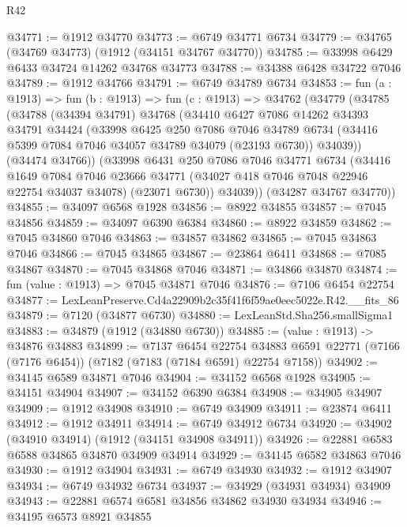 \begin{lexlean}{R42}
\begin{coremodule}
{@34771 := @1912 @34770
@34773 := @6749 @34771 @6734
@34779 := @34765 (@34769 @34773) (@1912 (@34151 @34767 @34770))
@34785 := @33998 @6429 @6433 @34724 @14262 @34768 @34773
@34788 := @34388 @6428 @34722 @7046
@34789 := @1912 @34766
@34791 := @6749 @34789 @6734
@34853 := fun (a : @1913) =>
  fun (b : @1913) =>
  fun (c : @1913) =>
  @34762
    (@34779
      (@34785
        (@34788
          (@34394 @34791)
          @34768
          (@34410
            @6427
            @7086
            @14262
            @34393
            @34791
            @34424
            (@33998
              @6425
              @250
              @7086
              @7046
              @34789
              @6734
              (@34416 @5399 @7084 @7046 @34057 @34789 @34079 (@23193 @6730))
              @34039))
          (@34474 @34766))
        (@33998
          @6431
          @250
          @7086
          @7046
          @34771
          @6734
          (@34416
            @1649
            @7084
            @7046
            @23666
            @34771
            (@34027 @418 @7046 @7048 @22946 @22754 @34037 @34078)
            (@23071 @6730))
          @34039))
      (@34287 @34767 @34770))
@34855 := @34097 @6568 @1928
@34856 := @8922 @34855
@34857 := @7045 @34856
@34859 := @34097 @6390 @6384
@34860 := @8922 @34859
@34862 := @7045 @34860 @7046
@34863 := @34857 @34862
@34865 := @7045 @34863 @7046
@34866 := @7045 @34865
@34867 := @23864 @6411
@34868 := @7085 @34867
@34870 := @7045 @34868 @7046
@34871 := @34866 @34870
@34874 := fun (value : @1913) => @7045 @34871 @7046
@34876 := @7106 @6454 @22754
@34877 := LexLeanPreserve.Cd4a22909b2c35f41f6f59ae0eec5022e.R42.__fits_86
@34879 := @7120 (@34877 @6730)
@34880 := LexLeanStd.Sha256.smallSigma1
@34883 := @34879 (@1912 (@34880 @6730))
@34885 := (value : @1913) -> @34876 @34883
@34899 := @7137
    @6454
    @22754
    @34883
    @6591
    @22771
    (@7166 (@7176 @6454))
    (@7182 (@7183 (@7184 @6591) @22754 @7158))
@34902 := @34145 @6589 @34871 @7046
@34904 := @34152 @6568 @1928
@34905 := @34151 @34904
@34907 := @34152 @6390 @6384
@34908 := @34905 @34907
@34909 := @1912 @34908
@34910 := @6749 @34909
@34911 := @23874 @6411
@34912 := @1912 @34911
@34914 := @6749 @34912 @6734
@34920 := @34902 (@34910 @34914) (@1912 (@34151 @34908 @34911))
@34926 := @22881 @6583 @6588 @34865 @34870 @34909 @34914
@34929 := @34145 @6582 @34863 @7046
@34930 := @1912 @34904
@34931 := @6749 @34930
@34932 := @1912 @34907
@34934 := @6749 @34932 @6734
@34937 := @34929 (@34931 @34934) @34909
@34943 := @22881 @6574 @6581 @34856 @34862 @34930 @34934
@34946 := @34195 @6573 @8921 @34855
}
\end{coremodule}
\end{lexlean}
